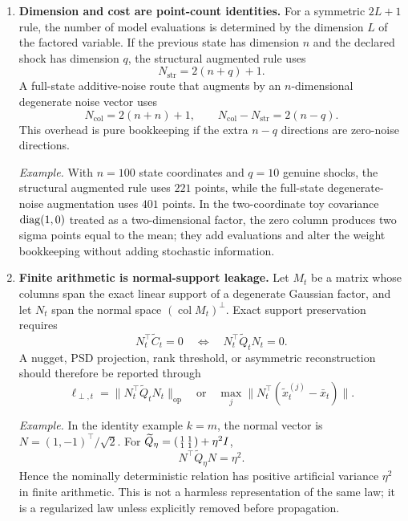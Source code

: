 \begin{enumerate}[label=(\roman*)]
  \item \textbf{Dimension and cost are point-count identities.}  For a
    symmetric $2L+1$ rule, the number of model evaluations is determined by the
    dimension $L$ of the factored variable.  If the previous state has dimension
    $n$ and the declared shock has dimension $q$, the structural augmented rule
    uses
    \[
      N_{\mathrm{str}}=2(n+q)+1.
    \]
    A full-state additive-noise route that augments by an $n$-dimensional
    degenerate noise vector uses
    \[
      N_{\mathrm{col}}=2(n+n)+1,
      \qquad
      N_{\mathrm{col}}-N_{\mathrm{str}}=2(n-q).
      \label{eq:bf-collapsed-point-count}
    \]
    This overhead is pure bookkeeping if the extra $n-q$ directions are
    zero-noise directions.

    \emph{Example.}  With $n=100$ state coordinates and $q=10$ genuine shocks,
    the structural augmented rule uses $221$ points, while the full-state
    degenerate-noise augmentation uses $401$ points.  In the two-coordinate toy
    covariance $\operatorname{diag}(1,0)$ treated as a two-dimensional factor, the zero
    column produces two sigma points equal to the mean; they add evaluations
    and alter the weight bookkeeping without adding stochastic information.

  \item \textbf{Finite arithmetic is normal-support leakage.}  Let $M_t$ be a
    matrix whose columns span the exact linear support of a degenerate
    Gaussian factor, and let $N_t$ span the normal space
    $(\operatorname{col}M_t)^\perp$.  Exact support preservation requires
    \[
      N_t^\top \widetilde C_t=0
      \quad\Longleftrightarrow\quad
      N_t^\top\widetilde Q_tN_t=0 .
      \label{eq:bf-collapsed-normal-support}
    \]
    A nugget, PSD projection, rank threshold, or asymmetric reconstruction
    should therefore be reported through
    \[
      \ell_{\perp,t}
      =
      \|N_t^\top\widetilde Q_tN_t\|_{\mathrm{op}}
      \quad\text{or}\quad
      \max_j\|N_t^\top(\widetilde x_t^{(j)}-\bar x_t)\|.
      \label{eq:bf-collapsed-support-leakage}
    \]

    \emph{Example.}  In the identity example $k=m$, the normal vector is
    $N=(1,-1)^\top/\sqrt2$.  For
    $\widetilde Q_\eta=
    \begin{psmallmatrix}1&1\\1&1\end{psmallmatrix}+\eta^2I$,
    \[
      N^\top\widetilde Q_\eta N=\eta^2.
    \]
    Hence the nominally deterministic relation has positive artificial
    variance $\eta^2$ in finite arithmetic.  This is not a harmless
    representation of the same law; it is a regularized law unless explicitly
    removed before propagation.


\end{enumerate}

